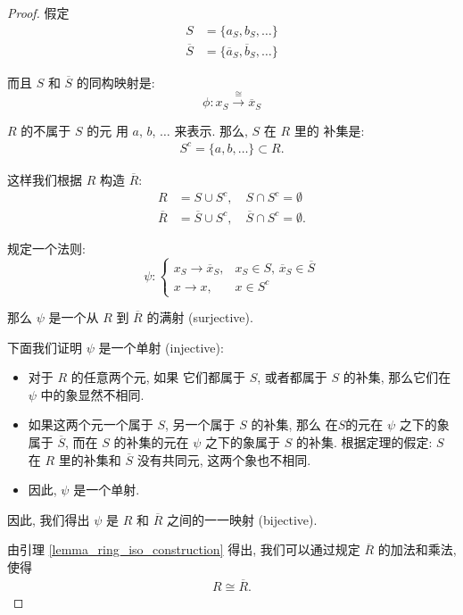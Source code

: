 \documentclass[utf8]{ctexbook}
\theoremstyle{definition}
\begin{document}
\begin{proof}
假定
\begin{align*}
S & = \{a_S, b_S, \ldots \} \\
\overline{S} & = \{ \overline{a}_S, \overline{b}_S, \ldots \}
\end{align*}

而且 $S$ 和 $\overline{S}$ 的同构映射是:
$$ \phi : x_S \overset{\cong}{\longrightarrow} \overline{x}_S $$

$R$ 的不属于 $S$ 的元 用 $a$, $b$, $\ldots$ 来表示. 那么, $S$ 在 $R$ 里的 补集是:
\begin{align*}
S^c = \{ a, b, \ldots \} \subset R.
\end{align*}

这样我们根据 $R$ 构造 $\overline{R}$:
\begin{align*}
R & = S \cup S^c, \quad S \cap S^c = \emptyset \\
\overline{R} & = \overline{S} \cup S^c, \quad \overline{S} \cap S^c = \emptyset .
\end{align*}

规定一个法则:
\begin{equation}
\psi : \left\{ 
\begin{array}{ll}
x_S \longrightarrow \overline{x}_S, & x_S \in S, \, \overline{x}_S \in \overline{S} \\
x \longrightarrow x , & x \in S^c 
\end{array}
\right. 
\end{equation}

那么 $\psi$ 是一个从 $R$ 到 $\overline{R}$ 的满射 (surjective). 

下面我们证明 $\psi$ 是一个单射 (injective): 
\begin{itemize}
\item{对于 $R$ 的任意两个元, 如果 它们都属于 $S$, 或者都属于 $S$ 的补集, 那么它们在 $\psi$ 中的象显然不相同.}
\item{如果这两个元一个属于 $S$, 另一个属于 $S$ 的补集, 那么 在$S$的元在 $\psi$ 之下的象属于 $\overline{S}$, 而在 $S$ 的补集的元在 $\psi$ 之下的象属于 $S$ 的补集. 根据定理的假定: $S$ 在 $R$ 里的补集和 $\overline{S}$ 没有共同元, 这两个象也不相同.}
\item{因此, $\psi$ 是一个单射.}
\end{itemize}

因此, 我们得出 $\psi$ 是 $R$ 和 $\overline{R}$ 之间的一一映射 (bijective). 

由引理 \ref{lemma_ring_iso_construction} 得出, 我们可以通过规定 $\overline{R}$ 的加法和乘法, 使得
\begin{align*}
R \cong \overline{R} .
\end{align*}



\end{proof}
\end{document}
